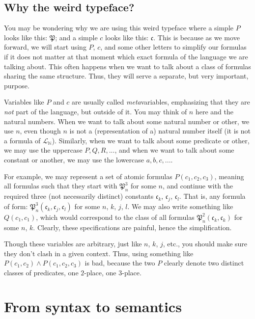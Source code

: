 \subsection{Why the weird typeface?}

You may be wondering why we are using this weird typeface where a simple $P$ looks like this: $\mathfrak{P}$; and a simple $c$ looks like this: $\mathfrak{c}$. This is because as we move forward, we will start using $P$, $c$, and some other letters to simplify our formulas if it does not matter at that moment which exact formula of the language we are talking about. This often happens when we want to talk about a class of formulas sharing the same structure. Thus, they will serve a separate, but very important, purpose. 

Variables like $P$ and $c$ are usually called \textit{meta}variables, emphasizing that they are \textit{not} part of the language, but outside of it. You may think of $n$ here and the natural numbers. When we want to talk about some natural number or other, we use $n$, even though $n$ is not a (representation of a) natural number itself (it is not a formula of $\mathcal{L}_\mathbb{N}$). Similarly, when we want to talk about some predicate or other, we may use the uppercase $P, Q, R, ...$, and when we want to talk about some constant or another, we may use the lowercase $a, b, c, ...$. 

For example, we may represent a set of atomic formulas $P(c_1, c_2, c_3)$, meaning all formulas such that they start with $\mathfrak{P}^3_n$ for some $n$, and continue with the required three (not necessarily distinct) constants $\mathfrak{c}_k$, $\mathfrak{c}_j$, $\mathfrak{c}_l$. That is, any formula of form: $\mathfrak{P}^3_n(\mathfrak{c}_k, \mathfrak{c}_j, \mathfrak{c}_l)$ for some $n$, $k$, $j$, $l$. We may also write something like $Q(c_1, c_1)$, which would correspond to the class of all formulas $\mathfrak{P}^2_n(\mathfrak{c}_k, \mathfrak{c}_k)$ for some $n$, $k$. Clearly, these specifications are painful, hence the simplification. 

Though these variables are arbitrary, just like $n$, $k$, $j$, etc., you should make sure they don't clash in a given context. Thus, using something like $P(c_1, c_2) \wedge P(c_1, c_2, c_3)$ is bad, because the two $P$ clearly denote two distinct classes of predicates, one $2$-place, one $3$-place. 

\section{From syntax to semantics}

